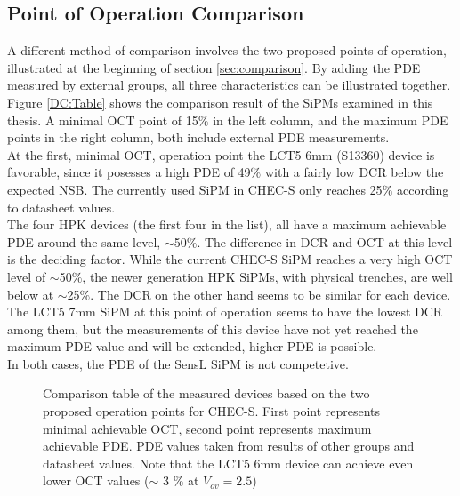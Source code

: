 \documentclass[12pt,article,type=msc,colorback,accentcolor=tud9c]{tudthesis}
\begin{document}
\subsection{Point of Operation Comparison}
\label{subsec:OP_comp}
A different method of comparison involves the two proposed points of operation, illustrated at the beginning of section \ref{sec:comparison}. By adding the PDE measured by external groups, all three characteristics can be illustrated together. Figure \ref{DC:Table} shows the comparison result of the SiPMs examined in this thesis. A minimal OCT point of 15$\%$ in the left column, and the maximum PDE points in the right column, both include external PDE measurements.\\
At the first, minimal OCT, operation point the LCT5 6mm (S13360) device is favorable, since it posesses a high PDE of 49$\%$ with a fairly low DCR below the expected NSB. The currently used SiPM in CHEC-S only reaches 25$\%$ according to datasheet values.\\
The four HPK devices (the first four in the list), all have a maximum achievable PDE around the same level, $\sim$50$\%$. The difference in DCR and OCT at this level is the deciding factor. While the current CHEC-S SiPM reaches a very high OCT level of $\sim$50$\%$, the newer generation HPK SiPMs, with physical trenches, are well below at $\sim$25$\%$. The DCR on the other hand seems to be similar for each device. The LCT5 7mm SiPM at this point of operation seems to have the lowest DCR among them, but the measurements of this device have not yet reached the maximum PDE value and will be extended, higher PDE is possible.\\
In both cases, the PDE of the SensL SiPM is not competetive.  



\begin{figure}[h]
\begin{centering}
\caption[Comparison based on two proposed points of operation]{Comparison table of the measured devices based on the two proposed operation points for CHEC-S. First point represents minimal achievable OCT, second point represents maximum achievable PDE. PDE values taken from results of other groups and datasheet values. Note that the LCT5 6mm device can achieve even lower OCT values ($\sim$ 3 $\%$ at $V_{ov}=2.5$)}
\label{fig:DC_Table}
\end{centering}
\end{figure}
\end{document}
